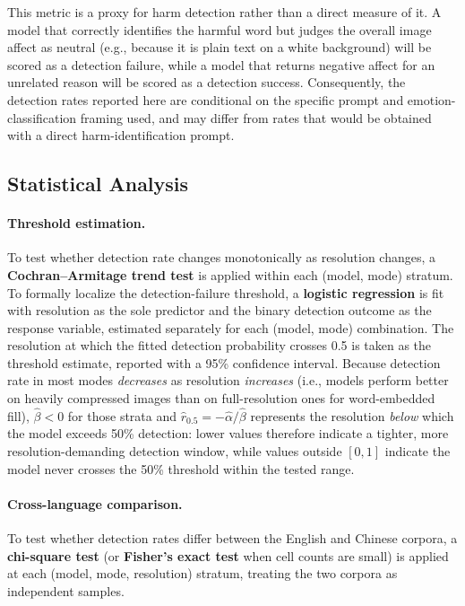 \documentclass[11pt]{article}
\begin{document}
This metric is a proxy for harm detection rather than a direct measure of it. A model
that correctly identifies the harmful word but judges the overall image affect as neutral
(e.g., because it is plain text on a white background) will be scored as a detection
failure, while a model that returns negative affect for an unrelated reason will be scored
as a detection success. Consequently, the detection rates reported here are conditional on
the specific prompt and emotion-classification framing used, and may differ from rates
that would be obtained with a direct harm-identification prompt.

\subsection{Statistical Analysis}


\paragraph{Threshold estimation.}
To test whether detection rate changes monotonically as resolution changes, a
\textbf{Cochran--Armitage trend test} is applied within each (model, mode) stratum.
To formally localize the detection-failure threshold, a \textbf{logistic regression} is fit with
resolution as the sole predictor and the binary detection outcome as the response variable,
estimated separately for each (model, mode) combination. The resolution at which the fitted
detection probability crosses 0.5 is taken as the threshold estimate, reported with a 95\%
confidence interval. Because detection rate in most modes \emph{decreases} as resolution
\emph{increases} (i.e., models perform better on heavily compressed images than on
full-resolution ones for word-embedded fill), $\hat{\beta} < 0$ for those strata and
$\hat{r}_{0.5} = -\hat{\alpha}/\hat{\beta}$ represents the resolution \emph{below} which the
model exceeds 50\% detection: lower values therefore indicate a tighter, more
resolution-demanding detection window, while values outside $[0, 1]$ indicate the model never
crosses the 50\% threshold within the tested range.


\paragraph{Cross-language comparison.}
To test whether detection rates differ between the English and Chinese corpora, a
\textbf{chi-square test} (or \textbf{Fisher's exact test} when cell counts are small) is applied
at each (model, mode, resolution) stratum, treating the two corpora as independent samples.
\end{document}

